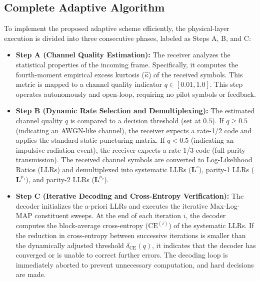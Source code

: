 \documentclass[journal,twocolumn]{IEEEtran}
\begin{document}
\subsection{Complete Adaptive Algorithm}
To implement the proposed adaptive scheme efficiently, the physical-layer execution is divided into three consecutive phases, labeled as Steps A, B, and C:
\begin{itemize}
  \item \textbf{Step A (Channel Quality Estimation):} The receiver analyzes the statistical properties of the incoming frame. Specifically, it computes the fourth-moment empirical excess kurtosis ($\hat{\kappa}$) of the received symbols. This metric is mapped to a channel quality indicator $q \in [0.01, 1.0]$. This step operates autonomously and open-loop, requiring no pilot symbols or feedback.
  \item \textbf{Step B (Dynamic Rate Selection and Demultiplexing):} The estimated channel quality $q$ is compared to a decision threshold (set at $0.5$). If $q \geq 0.5$ (indicating an AWGN-like channel), the receiver expects a rate-1/2 code and applies the standard static puncturing matrix. If $q < 0.5$ (indicating an impulsive radiation event), the receiver expects a rate-1/3 code (full parity transmission). The received channel symbols are converted to Log-Likelihood Ratios (LLRs) and demultiplexed into systematic LLRs ($\mathbf{L}^s$), parity-1 LLRs ($\mathbf{L}^{p_1}$), and parity-2 LLRs ($\mathbf{L}^{p_2}$).
  \item \textbf{Step C (Iterative Decoding and Cross-Entropy Verification):} The decoder initializes the a-priori LLRs and executes the iterative Max-Log-MAP constituent sweeps. At the end of each iteration $i$, the decoder computes the block-average cross-entropy ($\mathrm{CE}^{(i)}$) of the systematic LLRs. If the reduction in cross-entropy between successive iterations is smaller than the dynamically adjusted threshold $\delta_{\mathrm{CE}}(q)$, it indicates that the decoder has converged or is unable to correct further errors. The decoding loop is immediately aborted to prevent unnecessary computation, and hard decisions are made.
\end{itemize}
\end{document}

